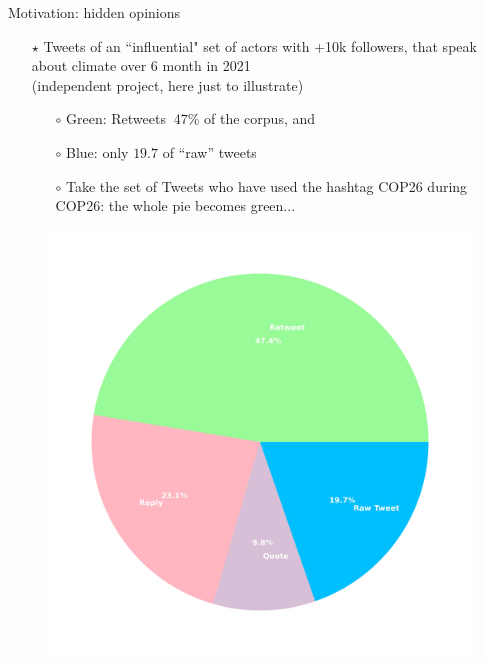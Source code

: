 \documentclass[xcolor=table,handout]{beamer}
\begin{document}
\begin{frame}{Motivation: hidden opinions}
\vspace{3mm}
\begin{itemize}
\item[$\star$] Tweets of an ``influential" set of actors with +10k followers, that speak about climate over 6 month in 2021 \\ {\color{gray}(independent project, here just to illustrate)} \bigskip

	\begin{itemize}\setlength\itemsep{1em}
		\item[$\circ$] Green: Retweets $~47\%$ of the corpus, and 
		\item[$\circ$] Blue: only $19.7$ of ``raw'' tweets
		\item[$\circ$] Take the set of Tweets who have used the hashtag COP26 during COP26: the whole pie becomes green...  
	\end{itemize} 
\end{itemize}
\begin{figure}
\centering
  \includegraphics[scale = 0.055]{./img/pie_tweets_all.jpg}
\end{figure}
\end{frame}
\end{document}
